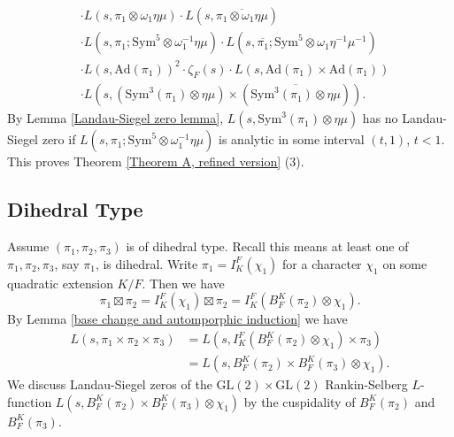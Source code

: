 \documentclass[12pt]{amsart}
\newcommand{\Ad}{\text{Ad}}
\newcommand{\Sym}{\text{Sym}}
\newcommand{\GL}{\text{GL}}
\newcommand{\ov}{\overline}
\begin{document}
\begin{enumerate}
\begin{align*}
        &\cdot L(s,\pi_1 \otimes \omega_1\eta\mu) \cdot L(s,\ov{\pi_1 \otimes \omega_1\eta\mu}) \\
        &\cdot L(s,\pi_1;\Sym^5 \otimes \omega_1^{-1}\eta\mu) \cdot L(s,\ov{\pi_1};\Sym^5 \otimes \omega_1\eta^{-1}\mu^{-1}) \\
        &\cdot L(s,\Ad(\pi_1))^2 \cdot \zeta_F(s) \cdot L(s,\Ad(\pi_1) \times \Ad(\pi_1)) \\
        &\cdot L(s,(\Sym^3(\pi_1) \otimes \eta\mu) \times (\ov{\Sym^3(\pi_1) \otimes \eta\mu})).
    \end{align*}
    By Lemma \ref{Landau-Siegel zero lemma}, $L(s,\Sym^3(\pi_1) \otimes \eta\mu)$ has no Landau-Siegel zero if $L(s,\pi_1;\Sym^5 \otimes \omega_1^{-1}\eta\mu)$ is analytic in some interval $(t,1)$, $t<1$. This proves Theorem \ref{Theorem A, refined version} (3).
\end{enumerate}

\subsection{Dihedral Type}\label{Section 3.3}
Assume $(\pi_1,\pi_2,\pi_3)$ is of dihedral type. Recall this means at least one of $\pi_1,\pi_2,\pi_3$, say $\pi_1$, is dihedral. Write $\pi_1 = I_K^F(\chi_1)$ for a character $\chi_1$ on some quadratic extension $K/F$. Then we have 
$$\pi_1 \boxtimes \pi_2 = I_K^F(\chi_1) \boxtimes \pi_2 = I_K^F(B_F^K(\pi_2) \otimes \chi_1).$$
By Lemma \ref{base change and automporphic induction} we have 
\begin{align*}
    L(s,\pi_1 \times \pi_2 \times \pi_3) &= L(s,I_K^F(B_F^K(\pi_2) \otimes \chi_1) \times \pi_3) \\
    &= L(s,B_F^K(\pi_2) \times B_F^K(\pi_3) \otimes \chi_1).
\end{align*}
We discuss Landau-Siegel zeros of the $\GL(2) \times \GL(2)$ Rankin-Selberg $L$-function $L(s,B_F^K(\pi_2) \times B_F^K(\pi_3) \otimes \chi_1)$ by the cuspidality of $B_F^K(\pi_2)$ and $B_F^K(\pi_3)$.
\end{document}
